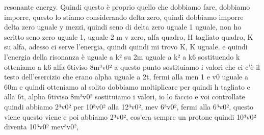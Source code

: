 {\begin{soluzione}
resonante energy. Quindi questo è proprio quello che dobbiamo fare, dobbiamo imporre, questo lo stiamo considerando delta zero, quindi dobbiamo imporre delta zero uguale y mezzi, quindi seno di delta zero uguale 1 uguale, non ho scritto seno zero uguale 1, uguale 2 m v zero, alfa quadro, H tagliato quadro, K su alfa, adesso ci serve l'energia, quindi quindi mi trovo K, K uguale. e quindi l'energia della risonanza è uguale a k² su 2m uguale a k² a k6 sostituendo k otteniamo a k6 alfa 6tiviso 8m³v0² a questo punto sostituiamo i valori che ci c'è il testo dell'esercizio che erano alpha uguale a 2t, fermi alla men 1 e v0 uguale a 60m e quindi otteniamo al solito dobbiamo moltiplicare per quindi h tagliato c alla 6t, alpha 6tiviso 8m³v0² sostituiamo i valori, io lo faccio e voi controllate quindi abbiamo 2³v0² per 10³v0² alla 12³v0², mev 6³v0², fermi alla 6³v0², questo viene questo viene e poi abbiamo 2³v0², cos'era sempre un protone quindi 10³v0² diventa 10³v0² mev³v0², 
   

\end{soluzione}}
